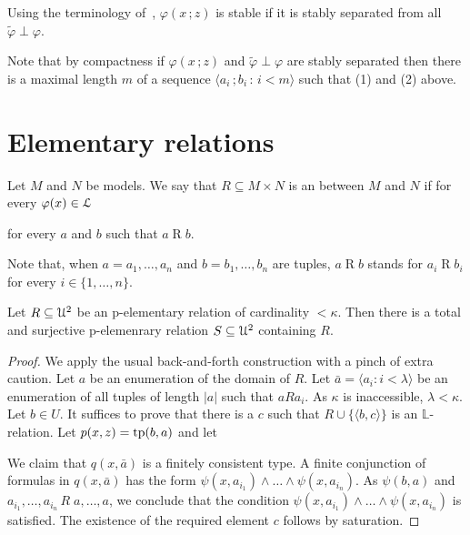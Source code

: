 \documentclass[10pt,oneside]{amsproc}
\renewcommand*{\emph}[1]{%
   \smash{\tikz[baseline]\node[rectangle, fill=teal!25, rounded corners, inner xsep=0.5ex, inner ysep=0.2ex, anchor=base, minimum height = 2.7ex]{\strut #1};}}
\begin{document}
{

Using the terminology of~\cite{Hr}, $\varphi(x\,;z)$ is stable if it is stably separated from all $\tilde\varphi\perp\varphi$.

Note that by compactness if $\varphi(x\,;z)$ and $\tilde\varphi\perp\varphi$ are stably separated then there is a maximal length $m$ of a sequence $\langle a_i\,;b_i\,:\,i<m\rangle$ such that (1) and (2) above.

\section{Elementary relations}

Let $M$ and $N$ be models.
We say that $R\subseteq M\times N$ is an \emph{p-elementary relation\/} between $M$ and $N$ if for every $\varphi(x)\in{\EuScript L}$

\hfill for every $a$ and $b$ such that $a\mathbin{R}b$.

Note that, when $a=a_1,\dots,a_n$ and $b=b_1,\dots,b_n$ are tuples, $a\mathbin{R}b$ stands for $a_i\mathbin{R}b_i$ for every $i\in\{1,\dots,n\}$.

\begin{fact}
  Let $R\subseteq{\EuScript U}^2$ be an p-elementary relation of cardinality $<\kappa$.
  Then there is a total and surjective p-elemenrary relation $S\subseteq{\EuScript U}^2$ containing $R$.
\end{fact}

\begin{proof}
  We apply the usual back-and-forth construction with a pinch of extra caution.
  Let $a$ be an enumeration of the domain of $R$.
  Let $\bar a=\langle a_i:i<\lambda\rangle$ be an enumeration of all tuples of length $|a|$ such that $aRa_i$.
  As $\kappa$ is inaccessible, $\lambda<\kappa$.
  Let $b\in U$.
  It suffices to prove that there is a $c$ such that $R\cup\{\langle b,c\rangle\}$ is an $\mathds{L}$-relation.
  Let $p(x,z)={\rm tp}(b,a)$ and let
  

  We claim that $q(x,\bar a)$ is a finitely consistent type.
  A finite conjunction of formulas in $q(x,\bar a)$ has the form $\psi(x,a_{i_1})\wedge\dots\wedge\psi(x,a_{i_n})$.
  As $\psi(b,a)$ and $a_{i_1},\dots,a_{i_n}\,R\;a,\dots,a$, we conclude that the condition $\psi(x,a_{i_1})\wedge\dots\wedge\psi(x,a_{i_n})$ is satisfied.
  The existence of the required element $c$ follows by saturation.
\end{proof}

}
\end{document}
